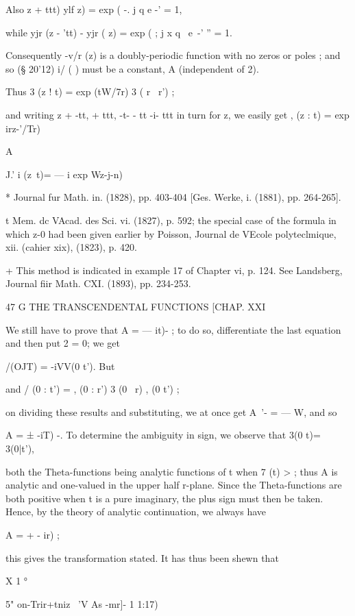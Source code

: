 Also z + ttt) ylf z) = exp ( -. j q e -' = 1,

while yjr (z - 'tt) - yjr ( z) = exp ( ; j x q~ e~-' '' = 1.

Consequently -v/r (z) is a doubly-periodic function with no zeros or
poles ; and so (§ 20'12) i/ ( ) must be a constant, A (independent of
2).

Thus 3 (z ! t) = exp (tW/7r) 3 ( r \ r') ;

and writing z + -tt, + ttt, -t- - tt -i- ttt in turn for z, we easily
get , (z : t) = exp irz-'/Tr) %

A%

J.' i (z\ t)= — i exp Wz-j-n) %

* Journal fur Math. in. (1828), pp. 403-404 [Ges. Werke, i. (1881),
pp. 264-265].

t Mem. dc VAcad. des Sci. vi. (1827), p. 592; the special case of the
formula in which z-0 had been given earlier by Poisson, Journal de
VEcole polyteclmique, xii. (cahier xix), (1823), p. 420.

+ This method is indicated in example 17 of Chapter vi, p. 124. See
Landsberg, Journal fiir Math. CXI. (1893), pp. 234-253.

47 G THE TRANSCENDENTAL FUNCTIONS [CHAP. XXI

We still have to prove that A = — it)- ; to do so, differentiate the
last equation and then put 2 = 0; we get

 /(OJT) = -iVV(0 t'). But %

and / (0 : t') = , (0 : r') 3 (0 \ r) , (0 t') ;

on dividing these results and substituting, we at once get A~'- = — W,
and so

A = ± -iT) -. To determine the ambiguity in sign, we observe that 3(0
t)= 3(0|t'),

both the Theta-functions being analytic functions of t when 7 (t) > ;
thus A is analytic and one-valued in the upper half r-plane. Since the
Theta-functions are both positive when t is a pure imaginary, the plus
sign must then be taken. Hence, by the theory of analytic
continuation, we always have

A = + - ir) ;

this gives the transformation stated. It has thus been shewn that

X 1 °

5" on-Trir+tniz \ 'V As -mr]- 1 1:17)

